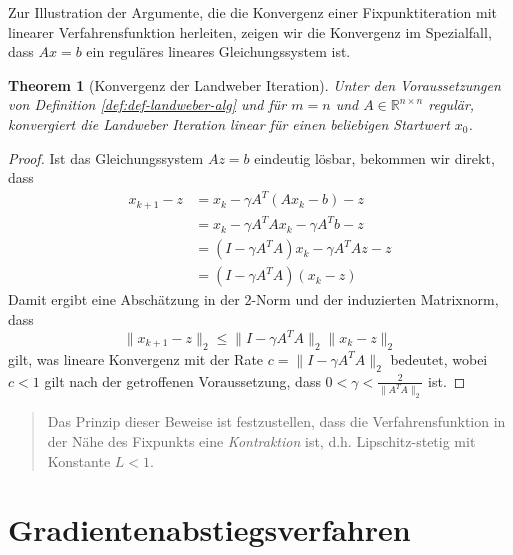 \documentclass[
]{book}
\newenvironment {JHSAYS} [0] {\begin{quote}\color{jhsc}} {\end{quote}}
\newtheorem{theorem}{Theorem}[chapter]
\theoremstyle{definition}
\theoremstyle{definition}
\theoremstyle{definition}
\theoremstyle{definition}
\theoremstyle{remark}
\begin{document}
Zur Illustration der Argumente, die die Konvergenz einer Fixpunktiteration mit linearer Verfahrensfunktion herleiten, zeigen wir die Konvergenz im Spezialfall, dass \(Ax=b\) ein reguläres lineares Gleichungssystem ist.

\begin{theorem}[Konvergenz der Landweber Iteration]
\protect\hypertarget{thm:thm-lw-conv}{}\label{thm:thm-lw-conv}Unter den Voraussetzungen von Definition \ref{def:def-landweber-alg} und für \(m=n\) und \(A\in \mathbb R^{n\times n}\) regulär, konvergiert die Landweber Iteration linear für einen beliebigen Startwert \(x_0\).
\end{theorem}

\begin{proof}
Ist das Gleichungssystem \(Az=b\) eindeutig lösbar, bekommen wir direkt, dass
\begin{equation*}
\begin{split}
x_{k+1} - z &= x_k - \gamma A^T(Ax_k -b ) - z  \\
&= x_k - \gamma A^TAx_k -\gamma A^Tb - z \\
&= (I-\gamma A^TA)x_k -\gamma A^TAz - z \\
&= (I-\gamma A^TA)(x_k - z)
\end{split}
\end{equation*}
Damit ergibt eine Abschätzung in der \(2\)-Norm und der induzierten Matrixnorm, dass
\begin{equation*}
\|x_{k+1}-z\|_2 \leq \|I-\gamma A^TA\|_2\|x_k-z\|_2
\end{equation*}
gilt, was lineare Konvergenz mit der Rate \(c=\|I-\gamma A^TA\|_2\) bedeutet, wobei \(c<1\) gilt nach der getroffenen Voraussetzung, dass \(0<\gamma<\frac{2}{\|A^TA\|_2}\) ist.
\end{proof}

\leavevmode{}%
\begin{JHSAYS}
Das Prinzip dieser Beweise ist festzustellen, dass die Verfahrensfunktion in der Nähe des Fixpunkts eine \emph{Kontraktion} ist, d.h. Lipschitz-stetig mit Konstante \(L<1\).

\end{JHSAYS}

\hypertarget{gradientenabstiegsverfahren}{%
\section{Gradientenabstiegsverfahren}\label{gradientenabstiegsverfahren}}
\end{document}

